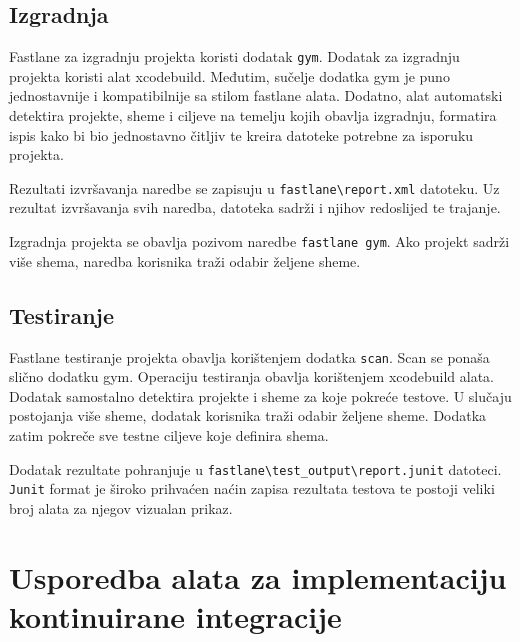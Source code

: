 \documentclass[times, utf8, diplomski, numeric]{fer}
\begin{document}
\begin{appendices}
\section{Izgradnja}

Fastlane za izgradnju projekta koristi dodatak \verb|gym|\citep{fastlane:gym}. Dodatak za izgradnju projekta koristi alat xcodebuild. Međutim, sučelje dodatka gym je puno jednostavnije i kompatibilnije sa stilom fastlane alata. Dodatno, alat automatski detektira projekte, sheme i ciljeve na temelju kojih obavlja izgradnju, formatira ispis kako bi bio jednostavno čitljiv te kreira datoteke potrebne za isporuku projekta.

Rezultati izvršavanja naredbe se zapisuju u \verb|fastlane\report.xml| datoteku. Uz rezultat izvršavanja svih naredba, datoteka sadrži i njihov redoslijed te trajanje.

Izgradnja projekta se obavlja pozivom naredbe \verb|fastlane gym|. Ako projekt sadrži više shema, naredba korisnika traži odabir željene sheme.

\section{Testiranje}

Fastlane testiranje projekta obavlja korištenjem dodatka \verb|scan|\citep{fastlane:scan}. Scan se ponaša slično dodatku gym. Operaciju testiranja obavlja korištenjem xcodebuild alata. Dodatak samostalno detektira projekte i sheme za koje pokreće testove. U slučaju postojanja više sheme, dodatak korisnika traži odabir željene sheme. Dodatka zatim pokreče sve testne ciljeve koje definira shema.

Dodatak rezultate pohranjuje u \verb|fastlane\test_output\report.junit| datoteci. \verb|Junit| format je široko prihvaćen naćin zapisa rezultata testova te postoji veliki broj alata za njegov vizualan prikaz.

\chapter{Usporedba alata za implementaciju kontinuirane integracije} \label{header:dodatak_usporedba_alata_za_kontinuiranu_integraciju}

\end{appendices}
\end{document}
